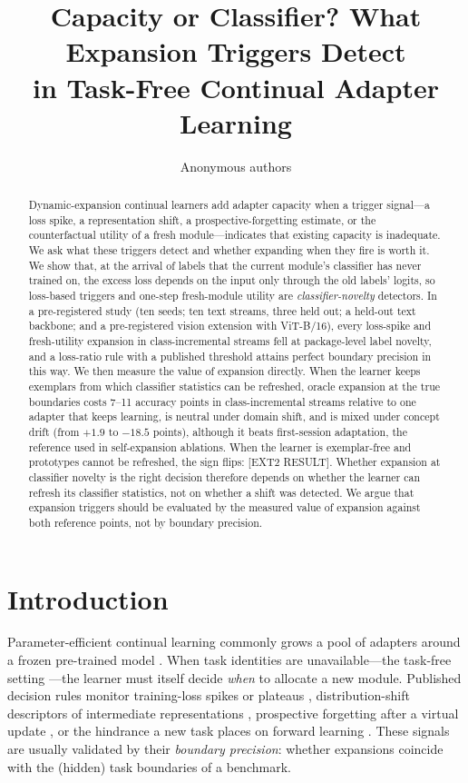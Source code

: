 \documentclass[10pt]{article}
\title{Capacity or Classifier? What Expansion Triggers Detect\\in Task-Free Continual Adapter Learning}
\author{Anonymous authors}
\begin{document}
\maketitle

\begin{abstract}
Dynamic-expansion continual learners add adapter capacity when a trigger signal---a loss spike, a representation shift, a prospective-forgetting estimate, or the counterfactual utility of a fresh module---indicates that existing capacity is inadequate. We ask what these triggers detect and whether expanding when they fire is worth it. We show that, at the arrival of labels that the current module's classifier has never trained on, the excess loss depends on the input only through the old labels' logits, so loss-based triggers and one-step fresh-module utility are \emph{classifier-novelty} detectors. In a pre-registered study (ten seeds; ten text streams, three held out; a held-out text backbone; and a pre-registered vision extension with ViT-B/16), every loss-spike and fresh-utility expansion in class-incremental streams fell at package-level label novelty, and a loss-ratio rule with a published threshold attains perfect boundary precision in this way. We then measure the value of expansion directly. When the learner keeps exemplars from which classifier statistics can be refreshed, oracle expansion at the true boundaries costs 7--11 accuracy points in class-incremental streams relative to one adapter that keeps learning, is neutral under domain shift, and is mixed under concept drift (from $+1.9$ to $-18.5$ points), although it beats first-session adaptation, the reference used in self-expansion ablations. When the learner is exemplar-free and prototypes cannot be refreshed, the sign flips: [EXT2 RESULT]. Whether expansion at classifier novelty is the right decision therefore depends on whether the learner can refresh its classifier statistics, not on whether a shift was detected. We argue that expansion triggers should be evaluated by the measured value of expansion against both reference points, not by boundary precision.
\end{abstract}

\section{Introduction}

Parameter-efficient continual learning commonly grows a pool of adapters around a frozen pre-trained model \citep{zhou2024ease,wang2025sema,wei2025onlinelora}. When task identities are unavailable---the task-free setting \citep{aljundi2019taskfree}---the learner must itself decide \emph{when} to allocate a new module. Published decision rules monitor training-loss spikes or plateaus \citep{wei2025onlinelora,tathe2026lace}, distribution-shift descriptors of intermediate representations \citep{wang2025sema}, prospective forgetting after a virtual update \citep{julian2025cable}, or the hindrance a new task places on forward learning \citep{feng2024lw2g}. These signals are usually validated by their \emph{boundary precision}: whether expansions coincide with the (hidden) task boundaries of a benchmark.
\end{document}
